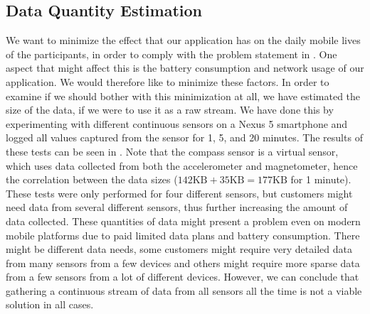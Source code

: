 
\subsection{Data Quantity Estimation}
\label{sec:data_quantity_estimation}

We want to minimize the effect that our application has on the daily mobile lives of the participants, in order to comply with the problem statement in . One aspect that might affect this is the battery consumption and network usage of our application. We would therefore like to minimize these factors. In order to examine if we should bother with this minimization at all, we have estimated the size of the data, if we were to use it as a raw stream. We have done this by experimenting with different continuous sensors on a Nexus 5 smartphone and logged all values captured from the sensor for 1, 5, and 20 minutes. The results of these tests can be seen in . Note that the compass sensor is a virtual sensor, which uses data collected from both the accelerometer and magnetometer, hence the correlation between the data sizes ($142 \text{KB} + 35 \text{KB} = 177 \text{KB}$ for 1 minute). These tests were only performed for four different sensors, but customers might need data from several different sensors, thus further increasing the amount of data collected. These quantities of data might present a problem even on modern mobile platforms due to paid limited data plans and battery consumption. There might be different data needs, some customers might require very detailed data from many sensors from a few devices and others might require more sparse data from a few sensors from a lot of different devices. However, we can conclude that gathering a continuous stream of data from all sensors all the time is not a viable solution in all cases.

